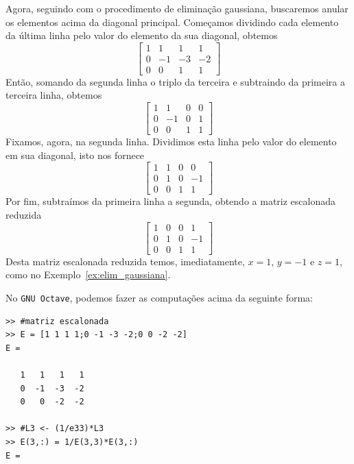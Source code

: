 \begin{ex}
Agora, seguindo com o procedimento de eliminação gaussiana, buscaremos anular os elementos acima da diagonal principal. Começamos dividindo cada elemento da última linha pelo valor do elemento da sua diagonal, obtemos
\begin{equation*}
  \begin{bmatrix}
    1 & 1 & 1 & 1\\
    0 & -1 & -3 & -2\\
    0 & 0 & 1 & 1
  \end{bmatrix}
\end{equation*}
Então, somando da segunda linha o triplo da terceira e subtraindo da primeira a terceira linha, obtemos
\begin{equation*}
  \begin{bmatrix}
    1 & 1 & 0 & 0\\
    0 & -1 & 0 & 1\\
    0 & 0 & 1 & 1
  \end{bmatrix}
\end{equation*}
Fixamos, agora, na segunda linha. Dividimos esta linha pelo valor do elemento em sua diagonal, isto nos fornece
\begin{equation*}
  \begin{bmatrix}
    1 & 1 & 0 & 0\\
    0 & 1 & 0 & -1\\
    0 & 0 & 1 & 1
  \end{bmatrix}
\end{equation*}
Por fim, subtraímos da primeira linha a segunda, obtendo a matriz escalonada reduzida
\begin{equation*}
  \begin{bmatrix}
    1 & 0 & 0 & 1\\
    0 & 1 & 0 & -1\\
    0 & 0 & 1 & 1
  \end{bmatrix}
\end{equation*}
Desta matriz escalonada reduzida temos, imediatamente, $x=1$, $y=-1$ e $z=1$, como no Exemplo~\ref{ex:elim_gaussiana}.

\ifisoctave
No \verb+GNU Octave+, podemos fazer as computações acima da seguinte forma:
\begin{verbatim}
>> #matriz escalonada
>> E = [1 1 1 1;0 -1 -3 -2;0 0 -2 -2]
E =

   1   1   1   1
   0  -1  -3  -2
   0   0  -2  -2

>> #L3 <- (1/e33)*L3
>> E(3,:) = 1/E(3,3)*E(3,:)
E =


\end{verbatim}
\end{ex}
